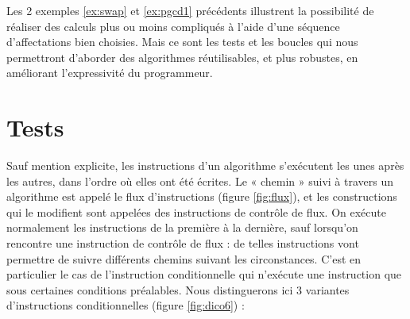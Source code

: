 Les 2 exemples \ref{ex:swap} et \ref{ex:pgcd1} précédents illustrent la possibilité
de réaliser des calculs plus ou moins compliqués à l'aide d'une séquence d'affectations 
bien choisies. Mais ce sont les tests et les boucles qui nous permettront
d'aborder des algorithmes réutilisables, et plus robustes, en améliorant
l'expressivité du programmeur.


\section{Tests}\label{tests}
Sauf mention explicite, les instructions d'un algorithme s'exécutent 
les unes après les autres, dans l'ordre où elles ont été écrites.
Le « chemin » suivi à travers un algorithme est appelé le flux d'instructions
(figure \ref{fig:flux}), 
et les constructions qui le modifient sont appelées des instructions de contrôle de flux.
On exécute normalement les instructions de la première à la dernière, sauf lorsqu'on rencontre
une instruction de contrôle de flux : de telles instructions vont permettre de suivre 
différents chemins suivant les circonstances.
C'est en particulier le cas de l'instruction conditionnelle qui n'exécute une instruction
que sous certaines conditions préalables. Nous distinguerons ici 3 variantes d'instructions conditionnelles 
(figure \ref{fig:dico6}) : 
